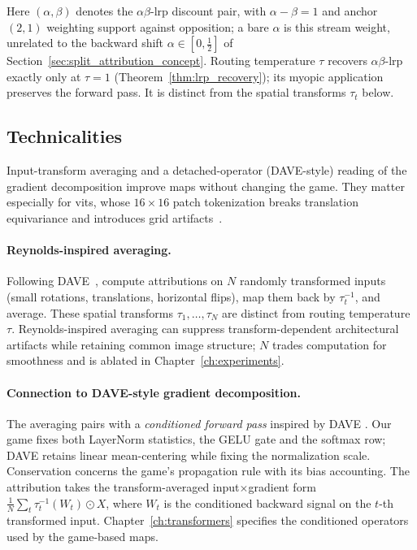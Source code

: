 Here $(\alpha,\beta)$ denotes the $\alpha\beta$-\ac{lrp} discount pair, with $\alpha-\beta=1$ and anchor $(2,1)$ weighting support against opposition; a bare $\alpha$ is this stream weight, unrelated to the backward shift $\alpha\in[0,\tfrac12]$ of Section~\ref{sec:split_attribution_concept}. Routing temperature $\tau$ recovers $\alpha\beta$-\ac{lrp} exactly only at $\tau=1$ (Theorem~\ref{thm:lrp_recovery}); its myopic application preserves the forward pass. It is distinct from the spatial transforms $\tau_t$ below.

\subsection{Technicalities}\label{subsec:technicalities}

Input-transform averaging and a detached-operator (DAVE-style) reading of the gradient decomposition improve maps without changing the game. They matter especially for \acp{vit}, whose $16\times16$ patch tokenization breaks translation equivariance and introduces grid artifacts~\parencite{Wrobel2024,Dosovitskiy2021vit}.

\paragraph{Reynolds-inspired averaging.} Following DAVE~\parencite{Wrobel2024}, compute attributions on $N$ randomly transformed inputs (small rotations, translations, horizontal flips), map them back by $\tau_t^{-1}$, and average. These spatial transforms $\tau_1,\dots,\tau_N$ are distinct from routing temperature $\tau$. Reynolds-inspired averaging can suppress transform-dependent architectural artifacts while retaining common image structure; $N$ trades computation for smoothness and is ablated in Chapter~\ref{ch:experiments}.

\paragraph{Connection to DAVE-style gradient decomposition.} The averaging pairs with a \emph{conditioned forward pass} inspired by DAVE \parencite{Wrobel2024}. Our game fixes both LayerNorm statistics, the GELU gate and the softmax row; DAVE retains linear mean-centering while fixing the normalization scale. Conservation concerns the game's propagation rule with its bias accounting. The attribution takes the transform-averaged input$\times$gradient form $\tfrac{1}{N}\sum_t \tau_t^{-1}(W_t) \odot X$, where $W_t$ is the conditioned backward signal on the $t$-th transformed input. Chapter~\ref{ch:transformers} specifies the conditioned operators used by the game-based maps.
